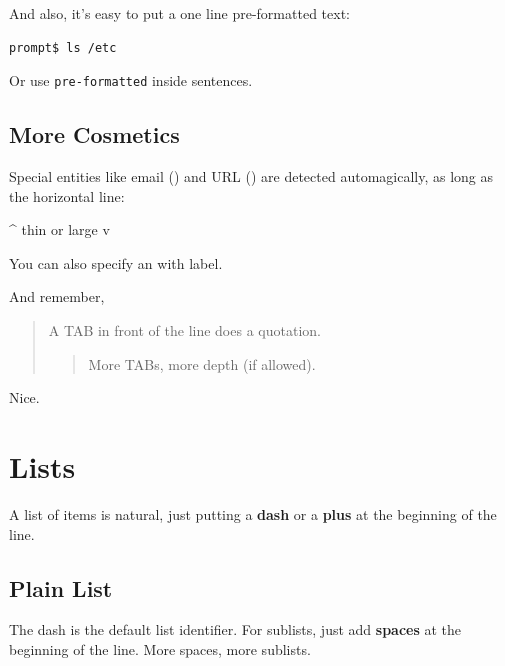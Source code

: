 \documentclass{article}
\begin{document}
And also, it's easy to put a one line pre-formatted
text:

\begin{verbatim}
prompt$ ls /etc
\end{verbatim}

Or use \texttt{pre-formatted} inside sentences.

\subsection*{More Cosmetics}
Special entities like email () and
URL () are detected automagically,
as long as the horizontal line:


\hrulefill{}

\^{} thin or large v

\clearpage

You can also specify an 
with label.

And remember,

	\begin{quotation}
A TAB in front of the line does a quotation.
		\begin{quotation}
More TABs, more depth (if allowed).
		\end{quotation}
	\end{quotation}
Nice.


\section*{Lists}
A list of items is natural, just putting a \textbf{dash} or
a \textbf{plus} at the beginning of the line.

\subsection*{Plain List}
The dash is the default list identifier. For sublists,
just add \textbf{spaces} at the beginning of the line. More
spaces, more sublists.
\end{document}

